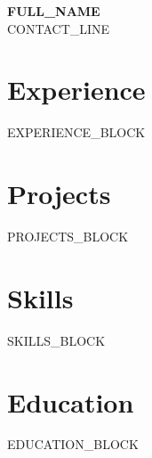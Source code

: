 \documentclass[11pt]{article}
\begin{document}
\begin{center}
  {\LARGE \textbf{ {{FULL_NAME}} }}\\[2pt]
  {\small {{CONTACT_LINE}} }
\end{center}

\section{Experience}
{{EXPERIENCE_BLOCK}}

\section{Projects}
{{PROJECTS_BLOCK}}

\section{Skills}
{{SKILLS_BLOCK}}

\section{Education}
{{EDUCATION_BLOCK}}
\end{document}
